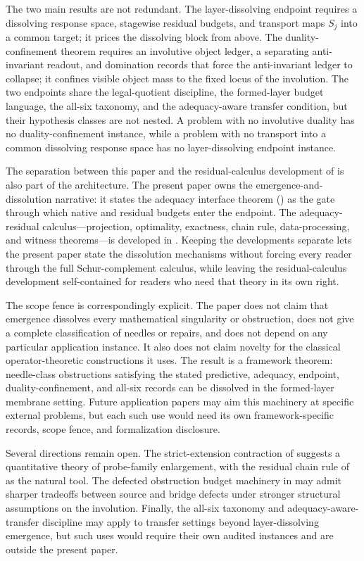 \documentclass[11pt]{article}
\theoremstyle{definition}
\begin{document}
The two main results are not redundant.  The layer-dissolving
endpoint requires a dissolving response space, stagewise residual
budgets, and transport maps \(S_j\) into a common target; it prices the
dissolving block from above.  The duality-confinement theorem requires
an involutive object ledger, a separating anti-invariant readout, and
domination records that force the anti-invariant ledger to collapse; it
confines visible object mass to the fixed locus of the involution.  The
two endpoints share the legal-quotient discipline, the formed-layer
budget language, the all-six taxonomy, and the adequacy-aware transfer
condition, but their hypothesis classes are not nested.  A problem with
no involutive duality has no duality-confinement instance, while a
problem with no transport into a common dissolving response space has
no layer-dissolving endpoint instance.

The separation between this paper and the residual-calculus development
of \citet{Tsiokos2026XiCompanion} is also part of the architecture.  The
present paper owns the emergence-and-dissolution narrative: it states the
adequacy interface theorem () as the
gate through which native and residual budgets enter the endpoint.  The
adequacy-residual calculus---projection, optimality, exactness, chain
rule, data-processing, and witness theorems---is developed in
\citet{Tsiokos2026XiCompanion}.  Keeping the developments separate lets
the present paper state the dissolution mechanisms without forcing every
reader through the full Schur-complement calculus, while leaving the
residual-calculus development self-contained for readers who need that
theory in its own right.

The scope fence is correspondingly explicit.  The paper does not claim
that emergence dissolves every mathematical singularity or obstruction,
does not give a complete classification of needles or repairs, and does
not depend on any particular application instance.  It also does not
claim novelty for the classical operator-theoretic constructions it
uses.  The result is a framework theorem: needle-class obstructions
satisfying the stated predictive, adequacy, endpoint,
duality-confinement, and all-six records can be dissolved in the
formed-layer membrane setting.  Future application papers may aim this
machinery at specific external problems, but each such use would need
its own framework-specific records, scope fence, and formalization
disclosure.

Several directions remain open.  The strict-extension contraction of
 suggests a quantitative
theory of probe-family enlargement, with the residual chain rule of
\citet{Tsiokos2026XiCompanion} as the natural tool.  The defected obstruction budget
machinery in  may admit sharper tradeoffs
between source and bridge defects under stronger structural assumptions
on the involution.  Finally, the all-six taxonomy and
adequacy-aware-transfer discipline may apply to transfer settings beyond
layer-dissolving emergence, but such uses would require their own
audited instances and are outside the present paper.
\end{document}

